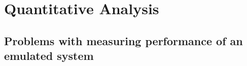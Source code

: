 
%
\section{Quantitative Analysis}
\subsection{Problems with measuring performance of an emulated system}


















